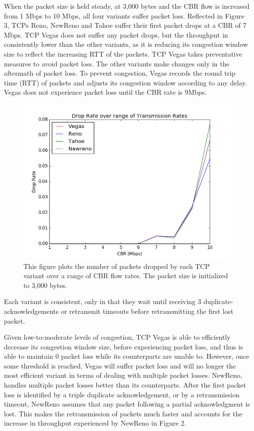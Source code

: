 When the packet size is held steady, at 3,000 bytes and the CBR flow is increased from 1 Mbps to 10 Mbps, all four variants suffer packet loss. Reflected in Figure 3, TCPs Reno, NewReno and Tahoe suffer their first packet drops at a CBR of 7 Mbps. TCP Vegas does not suffer any packet drops, but the throughput in consistently lower than the other variants, as it is reducing its congestion window size to reflect the increasing RTT of the packets. TCP Vegas takes preventative measures to avoid packet loss. The other variants make changes only in the aftermath of packet loss. To prevent congestion, Vegas records the round trip time (RTT) of packets and adjusts its congestion window according to any delay.  Vegas does not experience packet loss until the CBR rate is 9Mbps.

\begin{figure}[!htbp]
	\includegraphics[scale=0.4]{P2.png}
	\caption{This figure plots the number of packets dropped by each TCP variant over a range of CBR flow rates. The packet size is initialized to 3,000 bytes.}
	\label{a:label}
\end{figure}

Each variant is consistent, only in that they wait until receiving 3 duplicate-acknowledgements or retransmit timeouts before retransmitting the first lost packet. 

Given low-to-moderate levels of congestion, TCP Vegas is able to efficiently decrease its congestion window size, before experiencing packet loss, and thus is able to maintain 0 packet loss while its counterparts are unable to. However, once some threshold is reached, Vegas will suffer packet loss and will no longer the most efficient variant in terms of dealing with multiple packet losses. NewReno, handles multiple packet losses better than its counterparts. After the first packet loss is identified by a triple duplicate acknowledgement, or by a retransmission timeout, NewReno assumes that any packet following a partial acknowledgment is lost. This makes the retransmission of packets much faster and accounts for the increase in throughput experienced by NewReno in Figure 2.


